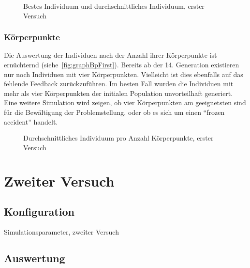       \begin{figure}
        \centering
        
        \caption{Bestes Individuum und durchschnittliches Individuum, erster Versuch\label{fig:graphFirst}}
      \end{figure}

      \subsubsection{Körperpunkte\label{subsub:bp}}

        Die Auswertung der Individuen nach der Anzahl ihrer Körperpunkte ist ernüchternd (siehe~\vref{fig:graphBpFirst}).
        Bereits ab der 14. Generation existieren nur noch Individuen mit vier Körperpunkten.
        Vielleicht ist dies ebenfalls auf das fehlende Feedback zurückzuführen.
        Im besten Fall wurden die Individuen mit mehr als vier Körperpunkten der initialen Population unvorteilhaft generiert.
        Eine weitere Simulation wird zeigen,
        ob vier Körperpunkten am geeignetsten sind für die Bewältigung der Problemstellung,
        oder ob es sich um einen ``frozen accident'' handelt.

        \begin{figure}[H]
          \centering
          
          \caption{Durchschnittliches Individuum pro Anzahl Körperpunkte, erster Versuch\label{fig:graphBpFirst}}
        \end{figure}

  \section{Zweiter Versuch}

    \subsection{Konfiguration}

      \begin{table}[H]
        \centering
        
        \caption{Simulationsparameter, zweiter Versuch}
      \end{table}

    \subsection{Auswertung\label{sub:scndAuswertung}}

